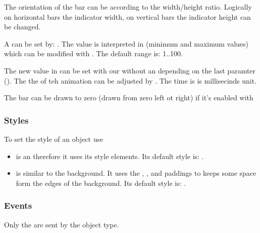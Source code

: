 \documentclass[letterpaper,10pt,english]{sphinxmanual}
\begin{document}
The orientation of the bar can be  according to the width/height ratio. Logically on horizontal bars the indicator width, on vertical bars the indicator height can be changed.

A  can be set by: .
The value is interpreted in  (minimum and maximum values) which can be modified with .
The default range is: 1..100.

The new value in  can be set with our without an  depending on the last paramter ().
The the of teh animation can be adjusted by . The time is is  millisecinds unit.

The bar can be drawn  to zero (drawn from zero left ot right) if it’s enabled with 


\subsubsection{Styles}
\label{\detokenize{object-types/bar:styles}}
To set the style of an  object use 
\begin{itemize}
\item {} 
 is an {\hyperref[\detokenize{object-types/obj::doc}]{}} therefore it uses its style elements. Its default style is: .

\item {} 
 is similar to the background. It uses the , ,  and  paddings to keeps some space form the edges of the background. Its default style is: .

\end{itemize}


\subsubsection{Events}
\label{\detokenize{object-types/bar:events}}
Only the  are sent by the object type.
\end{document}
